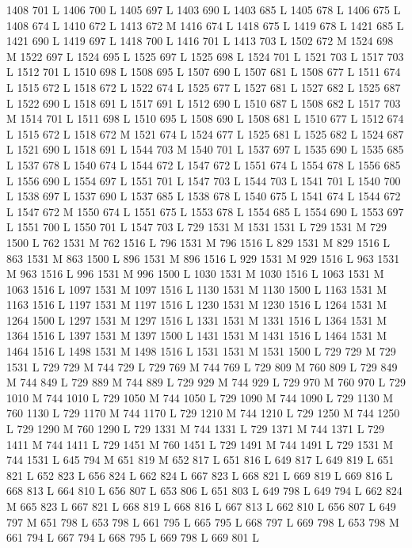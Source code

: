 {{{{{{{{{{{{{{{{{{{{{{{{{{{1408 701 L
1406 700 L
1405 697 L
1403 690 L
1403 685 L
1405 678 L
1406 675 L
1408 674 L
1410 672 L
1413 672 M 1416 674 L
1418 675 L
1419 678 L
1421 685 L
1421 690 L
1419 697 L
1418 700 L
1416 701 L
1413 703 L
1502 672 M 1524 698 M 1522 697 L
1524 695 L
1525 697 L
1525 698 L
1524 701 L
1521 703 L
1517 703 L
1512 701 L
1510 698 L
1508 695 L
1507 690 L
1507 681 L
1508 677 L
1511 674 L
1515 672 L
1518 672 L
1522 674 L
1525 677 L
1527 681 L
1527 682 L
1525 687 L
1522 690 L
1518 691 L
1517 691 L
1512 690 L
1510 687 L
1508 682 L
1517 703 M 1514 701 L
1511 698 L
1510 695 L
1508 690 L
1508 681 L
1510 677 L
1512 674 L
1515 672 L
1518 672 M 1521 674 L
1524 677 L
1525 681 L
1525 682 L
1524 687 L
1521 690 L
1518 691 L
1544 703 M 1540 701 L
1537 697 L
1535 690 L
1535 685 L
1537 678 L
1540 674 L
1544 672 L
1547 672 L
1551 674 L
1554 678 L
1556 685 L
1556 690 L
1554 697 L
1551 701 L
1547 703 L
1544 703 L
1541 701 L
1540 700 L
1538 697 L
1537 690 L
1537 685 L
1538 678 L
1540 675 L
1541 674 L
1544 672 L
1547 672 M 1550 674 L
1551 675 L
1553 678 L
1554 685 L
1554 690 L
1553 697 L
1551 700 L
1550 701 L
1547 703 L
729 1531 M 1531 1531 L
729 1531 M 729 1500 L
762 1531 M 762 1516 L
796 1531 M 796 1516 L
829 1531 M 829 1516 L
863 1531 M 863 1500 L
896 1531 M 896 1516 L
929 1531 M 929 1516 L
963 1531 M 963 1516 L
996 1531 M 996 1500 L
1030 1531 M 1030 1516 L
1063 1531 M 1063 1516 L
1097 1531 M 1097 1516 L
1130 1531 M 1130 1500 L
1163 1531 M 1163 1516 L
1197 1531 M 1197 1516 L
1230 1531 M 1230 1516 L
1264 1531 M 1264 1500 L
1297 1531 M 1297 1516 L
1331 1531 M 1331 1516 L
1364 1531 M 1364 1516 L
1397 1531 M 1397 1500 L
1431 1531 M 1431 1516 L
1464 1531 M 1464 1516 L
1498 1531 M 1498 1516 L
1531 1531 M 1531 1500 L
729 729 M 729 1531 L
729 729 M 744 729 L
729 769 M 744 769 L
729 809 M 760 809 L
729 849 M 744 849 L
729 889 M 744 889 L
729 929 M 744 929 L
729 970 M 760 970 L
729 1010 M 744 1010 L
729 1050 M 744 1050 L
729 1090 M 744 1090 L
729 1130 M 760 1130 L
729 1170 M 744 1170 L
729 1210 M 744 1210 L
729 1250 M 744 1250 L
729 1290 M 760 1290 L
729 1331 M 744 1331 L
729 1371 M 744 1371 L
729 1411 M 744 1411 L
729 1451 M 760 1451 L
729 1491 M 744 1491 L
729 1531 M 744 1531 L
645 794 M 651 819 M 652 817 L
651 816 L
649 817 L
649 819 L
651 821 L
652 823 L
656 824 L
662 824 L
667 823 L
668 821 L
669 819 L
669 816 L
668 813 L
664 810 L
656 807 L
653 806 L
651 803 L
649 798 L
649 794 L
662 824 M 665 823 L
667 821 L
668 819 L
668 816 L
667 813 L
662 810 L
656 807 L
649 797 M 651 798 L
653 798 L
661 795 L
665 795 L
668 797 L
669 798 L
653 798 M 661 794 L
667 794 L
668 795 L
669 798 L
669 801 L
}}}}}}}}}}}}}}}}}}}}}}}}}}}

